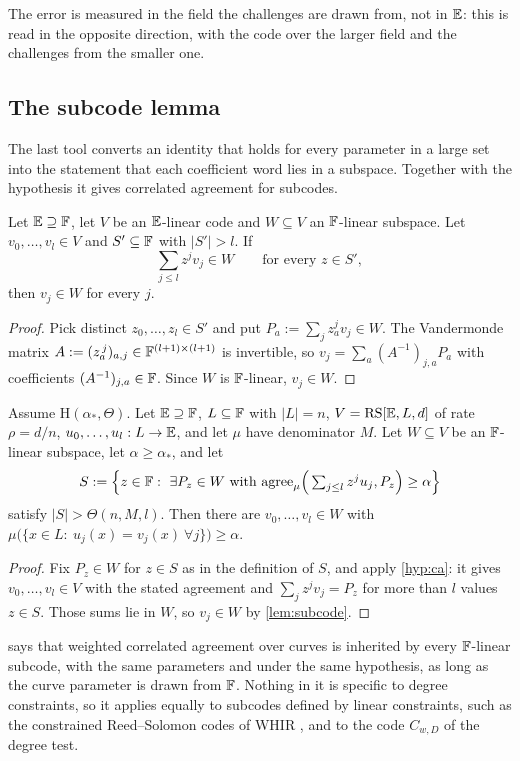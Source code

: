 The error is measured in the field the challenges are drawn from, not in $\mathbb{E}$: this is
\cite[Remark~1.2]{BCIKS20} read in the opposite direction, with the code over the larger field and
the challenges from the smaller one.

\subsection{The subcode lemma}\label{sec:subcode}

The last tool converts an identity that holds for every parameter in a large set into the statement
that each coefficient word lies in a subspace. Together with the hypothesis it gives correlated
agreement for subcodes.

\begin{lemma}\label{lem:subcode}
Let $\mathbb{E}\supseteq\mathbb{F}$, let $V$ be an $\mathbb{E}$-linear code and $W\subseteq V$ an $\mathbb{F}$-linear subspace.
Let $v_0,\dots,v_l\in V$ and $S'\subseteq\mathbb{F}$ with $|S'|>l$. If
\[
\textstyle\sum_{j\le l}z^jv_j\in W\qquad\text{for every }z\in S',
\]
then $v_j\in W$ for every $j$.
\end{lemma}

\begin{proof}
Pick distinct $z_0,\dots,z_l\in S'$ and put $P_a:=\sum_jz_a^jv_j\in W$. The Vandermonde matrix
$A:=(z_a^{\,j})_{a,j}\in\mathbb{F}^{(l+1)\times(l+1)}$ is invertible, so $v_j=\sum_a(A^{-1})_{j,a}P_a$
with coefficients $(A^{-1})_{j,a}\in\mathbb{F}$. Since $W$ is $\mathbb{F}$-linear, $v_j\in W$.
\end{proof}

\begin{corollary}\label{cor:share}
Assume $\mathrm H(\alpha_*,\Theta)$. Let $\mathbb{E}\supseteq\mathbb{F}$, $L\subseteq\mathbb{F}$ with $|L|=n$,
$V=\mathrm{RS}[\mathbb{E},L,d]$ of rate $\rho=d/n$, $u_0,\dots,u_l:L\to\mathbb{E}$, and let $\mu$ have denominator $M$.
Let $W\subseteq V$ be an $\mathbb{F}$-linear subspace, let $\alpha\ge\alpha_*$, and let
\[
S:=\Big\{z\in\F:\ \exists P_z\in W\ \text{with}\ \agree_\mu\Big(\textstyle\sum_{j\le l}z^ju_j,P_z\Big)\ge\alpha\Big\}
\]
satisfy $|S|>\Theta(n,M,l)$. Then there are $v_0,\dots,v_l\in W$ with
$\mu\big(\{x\in L:\ u_j(x)=v_j(x)\ \forall j\}\big)\ge\alpha$.
\end{corollary}

\begin{proof}
Fix $P_z\in W$ for $z\in S$ as in the definition of $S$, and apply \cref{hyp:ca}: it gives
$v_0,\dots,v_l\in V$ with the stated agreement and $\sum_jz^jv_j=P_z$ for more than $l$ values
$z\in S$. Those sums lie in $W$, so $v_j\in W$ by \cref{lem:subcode}.
\end{proof}

 says that weighted correlated agreement over curves is inherited by every
$\mathbb{F}$-linear subcode, with the same parameters and under the same hypothesis, as long as the curve
parameter is drawn from $\mathbb{F}$. Nothing in it is specific to degree constraints, so it applies
equally to subcodes defined by linear constraints, such as the constrained Reed--Solomon codes of
WHIR \cite{ACFY25}, and to the code $C_{w,D}$ of the degree test.
